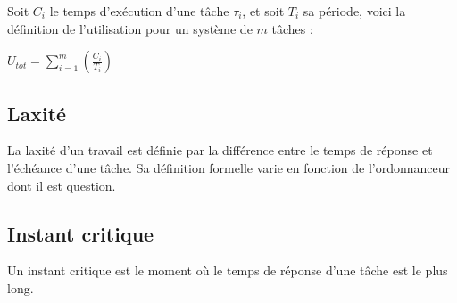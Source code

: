 	Soit $C_i$ le temps d'exécution d'une tâche $\tau_i$, et soit $T_i$ sa période, voici la définition de 
	l'utilisation pour un système de $m$ tâches :\medskip
	\begin{center}
		$U_{tot} = \sum_{i = 1}^{m}(\frac{C_i}{T_i})$
	\end{center}
	
	\subsection{Laxité}
	\label{laxite}
	La laxité d'un travail est définie par la différence entre le temps de réponse et l'échéance 
	d'une tâche. Sa définition formelle varie en fonction de l'ordonnanceur dont il est question.
	
	\subsection{Instant critique}
	\label{instantcritique}
	Un instant critique est le moment où le temps de réponse d'une tâche est le plus long.

